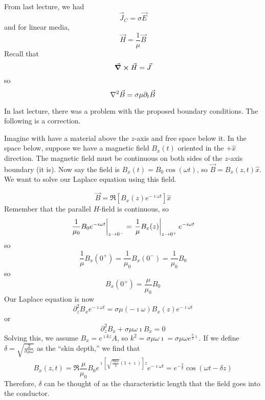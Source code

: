 \documentclass[a4paper,twoside,master.tex]{subfiles}
\begin{document}

From last lecture, we had
\begin{equation}
    \vec{J}_{C} = \sigma \vec{E}
\end{equation}
and for linear media,
\begin{equation}
    \vec{H} = \frac{1}{\mu} \vec{B}
\end{equation}
Recall that
\begin{equation}
    \curl{ \vec{H}} = \vec{J}
\end{equation}
so
\begin{equation}
    \laplacian{ \vec{B}} = \sigma \mu \partial_t \vec{B}
\end{equation}

In last lecture, there was a problem with the proposed boundary conditions. The following is a correction.

Imagine with have a material above the $ z $-axis and free space below it. In the space below, suppose we have a magnetic field $ B_x(t) $ oriented in the $ + \hat{x} $ direction. The magnetic field must be continuous on both sides of the $ z $-axis boundary (it is). Now say the field is $ B_x(t) = B_0 \cos(\omega t) $, so $ \vec{B} = B_x(z,t) \hat{x} $. We want to solve our Laplace equation using this field.

\begin{equation}
    \vec{B} = \Re[B_x(z) e^{- \imath \omega t} ] \hat{x}
\end{equation}
Remember that the parallel $ H $-field is continuous, so
\begin{equation}
    \eval{\frac{1}{\mu_0} B_0 e^{- \imath \omega t}}_{z \to 0^-} = \eval{\frac{1}{\mu} B_x(z)}_{z \to 0^+} e^{- \imath \omega t}
\end{equation}
so
\begin{equation}
    \frac{1}{\mu} B_x(0^+) = \frac{1}{\mu_0} B_x(0^-) = \frac{1}{\mu_0} B_0
\end{equation}
so
\begin{equation}
    B_x(0^+) = \frac{\mu}{\mu_0} B_0
\end{equation}
Our Laplace equation is now
\begin{equation}
    \partial^2_z B_x e^{- \imath \omega t} = \sigma \mu (-\imath \omega) B_x(z) e^{- \imath \omega t}
\end{equation}
or
\begin{equation}
    \partial^2_z B_x + \sigma \mu \omega \imath B_x = 0
\end{equation}
Solving this, we assume $ B_x = e^{\imath k z} A $, so $ k^2 = \sigma \mu \omega \imath = \sigma \mu \omega e^{\frac{\pi}{2} \imath} $.
If we define $ \delta = \sqrt{\frac{2}{\sigma \mu \omega}} $ as the ``skin depth,'' we find that
\begin{equation}
    B_x(z,t) = \Re{\frac{\mu}{\mu_0} B_0 e^{\imath \left[ \sqrt{\frac{\sigma \mu \omega}{2}} (1+\imath) \right]z} e^{- \imath \omega t}} = e^{- \frac{2}{\delta}} \cos(\omega t - \delta z)
\end{equation}
Therefore, $ \delta $ can be thought of as the characteristic length that the field goes into the conductor.
\end{document}
